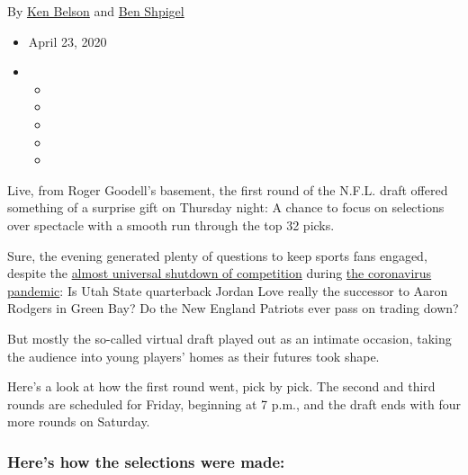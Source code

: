 By \href{https://www.nytimes3xbfgragh.onion/by/ken-belson}{Ken Belson}
and \href{https://www.nytimes3xbfgragh.onion/by/ben-shpigel}{Ben
Shpigel}

\begin{itemize}
\item
  April 23, 2020
\item
  \begin{itemize}
  \item
  \item
  \item
  \item
  \item
  \end{itemize}
\end{itemize}

Live, from Roger Goodell's basement, the first round of the N.F.L. draft
offered something of a surprise gift on Thursday night: A chance to
focus on selections over spectacle with a smooth run through the top 32
picks.

Sure, the evening generated plenty of questions to keep sports fans
engaged, despite the
\href{https://www.nytimes3xbfgragh.onion/article/coronavirus-sports-leagues-returning-canceled.html}{almost
universal shutdown of competition} during
\href{https://www.nytimes3xbfgragh.onion/news-event/coronavirus}{the
coronavirus pandemic}: Is Utah State quarterback Jordan Love really the
successor to Aaron Rodgers in Green Bay? Do the New England Patriots
ever pass on trading down?

But mostly the so-called virtual draft played out as an intimate
occasion, taking the audience into young players' homes as their futures
took shape.

Here's a look at how the first round went, pick by pick. The second and
third rounds are scheduled for Friday, beginning at 7 p.m., and the
draft ends with four more rounds on Saturday.

\hypertarget{heres-how-the-selections-were-made}{%
\subsubsection{Here's how the selections were
made:}\label{heres-how-the-selections-were-made}}


